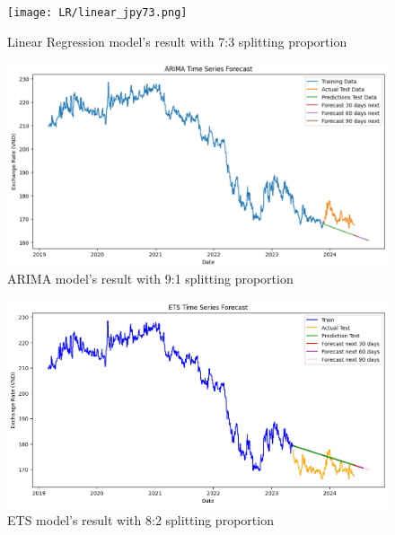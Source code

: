 \documentclass{ieeeojies}
\begin{document}
\begin{figure}[H]
  \centering
  \begin{minipage}{0.8\linewidth}
    \centering
    \texttt{[image: LR/linear\_jpy73.png]}
    \caption{Linear Regression model's result with 7:3 splitting proportion}
    \label{fig26}
  \end{minipage}
\end{figure}
\begin{figure}[H]
  \centering
  \begin{minipage}{0.8\linewidth}
    \centering
    \includegraphics[width=\linewidth]{ARIMA/arima_jpy_91.png}
    \caption{ARIMA model's result with 9:1 splitting proportion}
    \label{fig27}
  \end{minipage}
\end{figure}
\begin{figure}[H]
  \centering
  \begin{minipage}{0.8\linewidth}
    \centering
    \includegraphics[width=\linewidth]{ETS/ETS_jpy_82.png}
    \caption{ETS model's result with 8:2 splitting proportion}
    \label{fig28}
  \end{minipage}
\end{figure}
\end{document}
